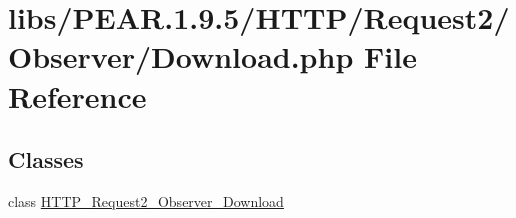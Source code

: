 \hypertarget{Download_8php}{\section{libs/\-P\-E\-A\-R.1.9.5/\-H\-T\-T\-P/\-Request2/\-Observer/\-Download.php File Reference}
\label{Download_8php}
}
\subsection*{Classes}
\begin{DoxyCompactItemize}
\item 
class \hyperlink{classHTTP__Request2__Observer__Download}{H\-T\-T\-P\-\_\-\-Request2\-\_\-\-Observer\-\_\-\-Download}
\end{DoxyCompactItemize}
